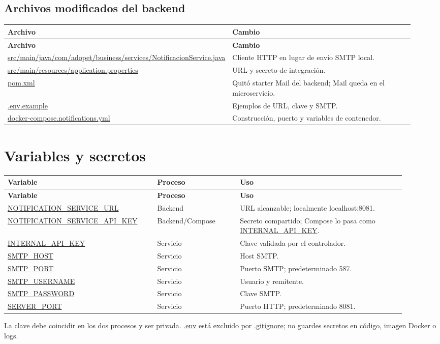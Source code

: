 \documentclass[11pt,a4paper]{article}
\newcommand{\pathcode}[1]{\small\url{#1}}\newcommand{\envvar}[1]{\small\url{#1}}
\begin{document}
\subsection{Archivos modificados del backend}
\begin{longtable}{p{0.45\linewidth}p{0.48\linewidth}}\toprule\textbf{Archivo} & \textbf{Cambio}\\\midrule\endfirsthead
\toprule\textbf{Archivo} & \textbf{Cambio}\\\midrule\endhead
\pathcode{src/main/java/com/adopet/business/services/NotificacionService.java} & Cliente HTTP en lugar de envío SMTP local.\\
\pathcode{src/main/resources/application.properties} & URL y secreto de integración.\\
\pathcode{pom.xml} & Quitó starter Mail del backend; Mail queda en el microservicio.\\
\pathcode{.env.example} & Ejemplos de URL, clave y SMTP.\\
\pathcode{docker-compose.notifications.yml} & Construcción, puerto y variables de contenedor.\\\bottomrule
\end{longtable}

\section{Variables y secretos}
\begin{longtable}{p{0.34\linewidth}p{0.19\linewidth}p{0.38\linewidth}}
\toprule\textbf{Variable} & \textbf{Proceso} & \textbf{Uso}\\\midrule\endfirsthead
\toprule\textbf{Variable} & \textbf{Proceso} & \textbf{Uso}\\\midrule\endhead
\envvar{NOTIFICATION_SERVICE_URL} & Backend & URL alcanzable; localmente localhost:8081.\\
\envvar{NOTIFICATION_SERVICE_API_KEY} & Backend/Compose & Secreto compartido; Compose lo pasa como \envvar{INTERNAL_API_KEY}.\\
\envvar{INTERNAL_API_KEY} & Servicio & Clave validada por el controlador.\\
\envvar{SMTP_HOST} & Servicio & Host SMTP.\\
\envvar{SMTP_PORT} & Servicio & Puerto SMTP; predeterminado 587.\\
\envvar{SMTP_USERNAME} & Servicio & Usuario y remitente.\\
\envvar{SMTP_PASSWORD} & Servicio & Clave SMTP.\\
\envvar{SERVER_PORT} & Servicio & Puerto HTTP; predeterminado 8081.\\\bottomrule
\end{longtable}
La clave debe coincidir en los dos procesos y ser privada. \pathcode{.env} está excluido por \pathcode{.gitignore}; no guardes secretos en código, imagen Docker o logs.
\end{document}
